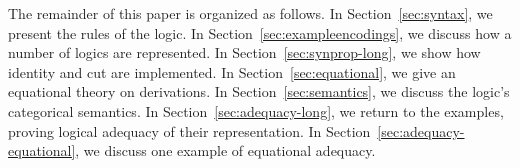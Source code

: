 
The remainder of this paper is organized as follows.  In
Section~\ref{sec:syntax}, we present the rules of the logic.  In
Section~\ref{sec:exampleencodings}, we discuss how a number of logics
are represented.  In Section~\ref{sec:synprop-long}, we show how
identity and cut are implemented.  In Section~\ref{sec:equational}, we
give an equational theory on derivations.  In
Section~\ref{sec:semantics}, we discuss the logic's categorical
semantics.  In Section~\ref{sec:adequacy-long}, we return to the
examples, proving logical adequacy of their representation.  In
Section~\ref{sec:adequacy-equational}, we discuss one example of
equational adequacy.
